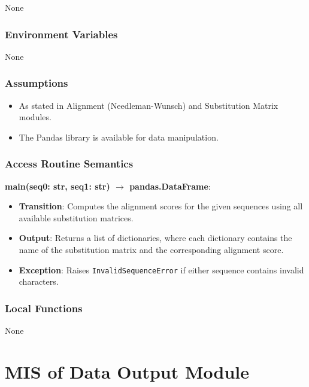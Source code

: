 \documentclass[12pt, titlepage]{article}
\begin{document}
None

\subsubsection{Environment Variables}

None

\subsubsection{Assumptions}

\begin{itemize}
    \item As stated in Alignment (Needleman-Wunsch) and Substitution Matrix modules.
    \item The Pandas library is available for data manipulation.
\end{itemize}

\subsubsection{Access Routine Semantics}

\noindent \textbf{main(seq0: str, seq1: str) $\rightarrow$ pandas.DataFrame}:
\begin{itemize}
    \item \textbf{Transition}: Computes the alignment scores for the given sequences using all available substitution matrices.
    \item \textbf{Output}: Returns a list of dictionaries, where each dictionary contains the name of the substitution matrix and the corresponding alignment score.
    \item \textbf{Exception}: Raises \texttt{InvalidSequenceError} if either sequence contains invalid characters.
\end{itemize}

\subsubsection{Local Functions}

None

\newpage

\section{MIS of Data Output Module} \label{mDO}
\end{document}
